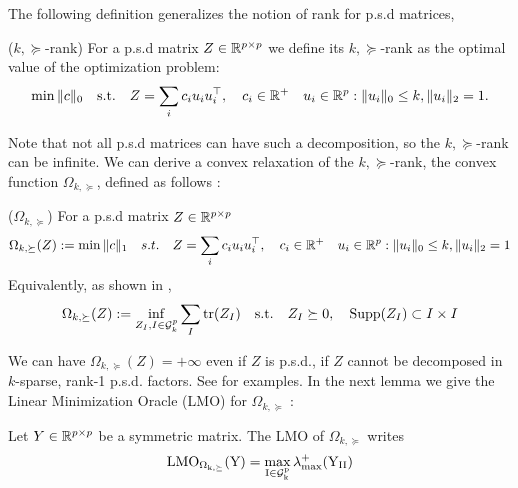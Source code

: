 The following definition generalizes the notion of rank for p.s.d matrices,
\begin{mydef}
($k,\succeq$-rank) For a p.s.d  matrix $Z\in\mathbb{R}^{p\times p}$ we define its $k,\succeq$-rank as the optimal
value of the optimization problem:
\begin{align}
\min \|c\|_0 \quad \text{s.t.} \quad Z=\sum_{i} c_i u_i u_{i}^\top, \quad c_i\in \mathbb{R}^{+} \quad u_{i}\in\mathbb{R}^p  :   \|u_{i}\|_0 \leq k, \|u_{i}\|_2 = 1.
\end{align}
\end{mydef}
Note that not all p.s.d matrices can have such a decomposition, so the $k,\succeq$-rank can be infinite. We can derive a convex relaxation of the $k,\succeq$-rank, the convex function $\Omega_{k,\succeq}$, defined as follows :
\begin{mydef}
($\Omega_{k,\succeq}$) For a p.s.d  matrix $Z\in\mathbb{R}^{p\times p}$ 
\begin{align}
\Omega_{k,\succeq}(Z):=\min \|c\|_1 \quad s.t. \quad Z=\sum_{i} c_i u_i u_{i}^\top, \quad c_i\in \mathbb{R}^{+} \quad u_{i}\in\mathbb{R}^p  :   \|u_{i}\|_0 \leq k, \|u_{i}\|_2 = 1
\end{align}
Equivalently, as shown in \citet{richard2014tight}, 
\begin{align}
\Omega_{k,\succeq}(Z):=\inf_{Z_I, I\in\mathcal{G}^p_k} \sum_{I}{\rm tr}(Z_I) \quad \text{s.t.} \quad Z_I\succeq 0 ,\quad{\rm Supp}(Z_I)\subset I\times I
\end{align}
\end{mydef}

We can have $\Omega_{k,\succeq}(Z)=+\infty$ even if $Z$ is p.s.d., if $Z$ cannot be decomposed in $k$-sparse,  rank-1 p.s.d. factors. See \citet{richard2014tight} for examples. In the next lemma we give the Linear Minimization Oracle (LMO) for $\Omega_{k,\succeq}$ :

\begin{lemm}
\label{lem:LMO}
Let $Y\in\mathbb{R}^{p\times p}$ be a symmetric matrix. The \rm{LMO} of $\Omega_{k,\succeq}$ writes
\begin{align}
\rm{LMO}_{\Omega_{k,\succeq}}(Y)= \max_{I\in\mathcal{G}^p_k}\lambda^{+}_{max}(Y_{II})
\end{align}
\end{lemm}

